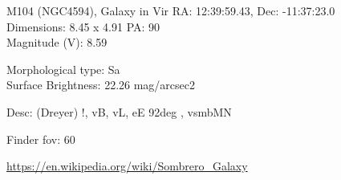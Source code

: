 \begin{block}{M104 (NGC4594), Galaxy in Vir}
    RA: 12:39:59.43, Dec: -11:37:23.0 \\ 
    Dimensions: 8.45 x 4.91 PA: 90 \\ 
    Magnitude (V): 8.59

    Morphological type: Sa \\ 
    Surface Brightness: 22.26 mag/arcsec2 

    Desc: (Dreyer) !, vB, vL, eE 92deg , vsmbMN 

    Finder fov: 60 

    \url{https://en.wikipedia.org/wiki/Sombrero_Galaxy} 
\end{block}